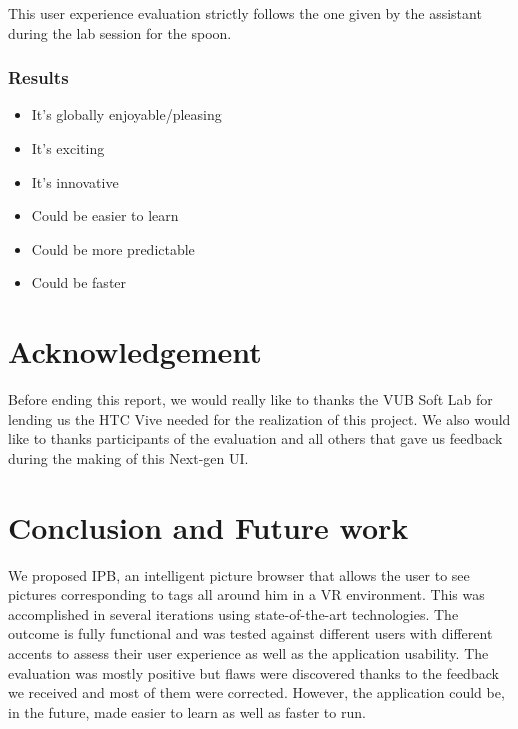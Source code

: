 \documentclass[11pt,a4paper]{article}
\begin{document}
This user experience evaluation strictly follows the one given by the assistant during the lab session for the spoon.

\subsubsection{Results}


\begin{itemize}
	\item It’s globally enjoyable/pleasing
	\item It’s exciting
	\item It’s innovative 
	\item Could be easier to learn 
	\item Could be more predictable
	\item Could be faster
\end{itemize}


\section{Acknowledgement}

Before ending this report, we would really like to thanks the VUB Soft Lab for lending us the HTC Vive needed for the realization of this project.
We also would like to thanks participants of the evaluation and all others that gave us feedback during the making of this Next-gen UI.

\section{Conclusion and Future work}
We proposed IPB, an intelligent picture browser that allows the user to see pictures corresponding to tags all around him in a VR environment. This was accomplished in several iterations using state-of-the-art technologies. The outcome is fully functional and was tested against different users with different accents to assess their user experience as well as the application usability. The evaluation was mostly positive but flaws were discovered thanks to the feedback we received and most of them were corrected. However, the application could be, in the future, made easier to learn as well as faster to run.
\end{document}
